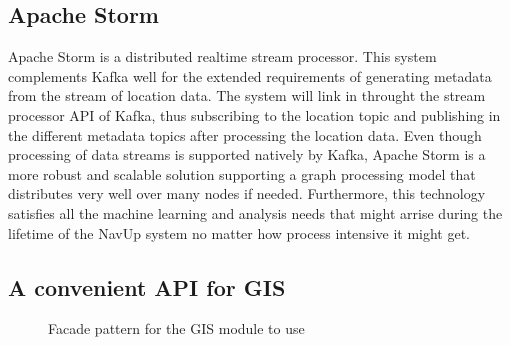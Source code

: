 \subsection{Apache Storm}
Apache Storm is a distributed realtime stream processor. This system complements Kafka well for the extended requirements of generating metadata from the stream of location data. The system will link in throught the stream processor API of Kafka, thus subscribing to the location topic and publishing in the different metadata topics after processing the location data. Even though processing of data streams is supported natively by Kafka, Apache Storm is a more robust and scalable solution supporting a graph processing model that distributes very well over many nodes if needed. Furthermore, this technology satisfies all the machine learning and analysis needs that might arrise during the lifetime of the NavUp system no matter how process intensive it might get.
\pagebreak
\subsection{A convenient API for GIS}
\begin{figure}[h]
\caption{Facade pattern for the GIS module to use}
\end{figure}


